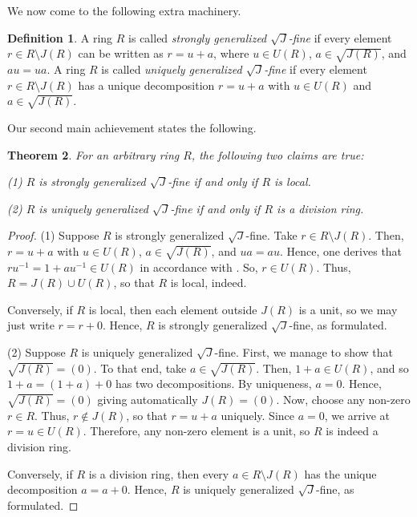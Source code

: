 \documentclass[12pt]{amsart}
\newtheorem{theorem}{Theorem}[section]
\theoremstyle{definition}
\newtheorem{definition}[theorem]{Definition}
\begin{document}
We now come to the following extra machinery.

\begin{definition}\label{2.32}
A ring \( R \) is called \textit{strongly generalized \(\sqrt{J}\)-fine} if every element \( r \in R \setminus J(R) \) can be written as \( r = u + a \), where \( u \in U(R) \), \( a\in \sqrt{J(R)} \), and \( au = ua \). A ring \( R \) is called \textit{uniquely generalized \(\sqrt{J}\)-fine} if every element \( r \in R \setminus J(R) \) has a unique decomposition \( r = u + a \) with \( u \in U(R) \) and \( a \in \sqrt{J(R)} \).
\end{definition}

Our second main achievement states the following.

\begin{theorem}\label{2.33}
For an arbitrary ring \( R \), the following two claims are true:
	
(1) \( R \) is strongly generalized \(\sqrt{J}\)-fine if and only if \( R \) is local.
	
(2) \( R \) is uniquely generalized \(\sqrt{J}\)-fine if and only if \( R \) is a division ring.
\end{theorem}

\begin{proof}
(1) Suppose \( R \) is strongly generalized \(\sqrt{J}\)-fine. Take \( r \in R \setminus J(R) \). Then, \( r = u + a \) with \( u \in U(R) \), \( a \in \sqrt{J(R)} \), and \( ua = au \). Hence, one derives that \( ru^{-1} = 1 + au^{-1} \in U(R) \) in accordance with \cite[Lemma 2.1(1), (3)]{DDE}. So, \( r \in U(R) \). Thus, \( R = J(R) \cup U(R) \), so that \( R \) is local, indeed. 

Conversely, if \( R \) is local, then each element outside \( J(R) \) is a unit, so we may just write \( r = r + 0 \). Hence, \( R \) is strongly generalized \(\sqrt{J}\)-fine, as formulated.
	
(2) Suppose \( R \) is uniquely generalized \(\sqrt{J}\)-fine. First, we manage to show that \( \sqrt{J(R)} = (0) \). To that end, take \( a \in \sqrt{J(R)} \). Then, \( 1 + a \in U(R) \), and so \( 1 + a = (1 + a) + 0 \) has two decompositions. By uniqueness, \( a = 0 \). Hence, \( \sqrt{J(R)} = (0) \) giving automatically \( J(R) = (0) \). Now, choose any non-zero \( r \in R \). Thus, \( r \not\in J(R) \), so that \( r = u + a \) uniquely. Since \( a = 0 \), we arrive at \( r = u \in U(R) \). Therefore, any non-zero element is a unit, so \( R \) is indeed a division ring. 

Conversely, if \( R \) is a division ring, then every \( a \in R \setminus J(R) \) has the unique decomposition \( a = a + 0 \). Hence, \( R \) is uniquely generalized \(\sqrt{J}\)-fine, as formulated.
\end{proof}
\end{document}

